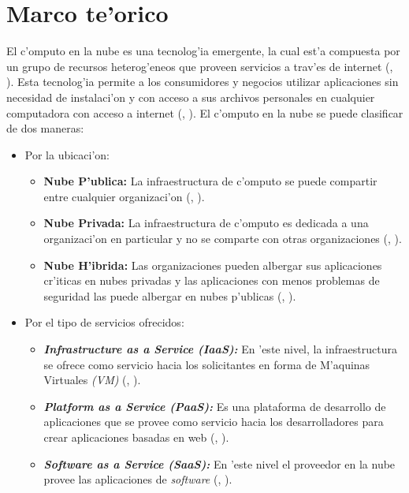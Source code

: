 \section{Marco te'orico}

El c'omputo en la nube es una tecnolog'ia emergente, la cual est'a compuesta por un grupo de recursos heterog'eneos que proveen servicios a trav'es de internet (\citeauthor{agarwal2014efficient}, \citeyear{agarwal2014efficient}).
Esta tecnolog'ia permite a los consumidores y negocios utilizar aplicaciones sin necesidad de instalaci'on y con acceso a sus archivos personales en cualquier computadora con acceso a internet (\citeauthor{ahmed2012advanced}, \citeyear{ahmed2012advanced}). 
El c'omputo en la nube se puede clasificar de dos maneras:
\begin{itemize}
	\item Por la ubicaci'on: 
	\begin{itemize}
		\item \textbf{Nube P'ublica:} La infraestructura de c'omputo se puede compartir entre cualquier organizaci'on (\citeauthor{ahmed2012advanced}, \citeyear{ahmed2012advanced}).
		\item \textbf{Nube Privada:} La infraestructura de c'omputo es dedicada a una organizaci'on en particular y no se comparte con otras organizaciones (\citeauthor{ahmed2012advanced}, \citeyear{ahmed2012advanced}).
		\item \textbf{Nube H'ibrida:} Las organizaciones pueden albergar sus aplicaciones cr'iticas en nubes privadas y las aplicaciones con menos problemas de seguridad las puede albergar en nubes p'ublicas (\citeauthor{ahmed2012advanced}, \citeyear{ahmed2012advanced}).
	\end{itemize}
	\item Por el tipo de servicios ofrecidos: 
	\begin{itemize}
		\item \textit{\textbf{Infrastructure as a Service (IaaS):}} En 'este nivel, la infraestructura se ofrece como servicio hacia los solicitantes en forma de M'aquinas Virtuales \textit{(VM)} (\citeauthor{agarwal2014efficient}, \citeyear{agarwal2014efficient}).
		\item \textit{\textbf{Platform as a Service (PaaS):}} Es una plataforma de desarrollo de aplicaciones que se provee como servicio hacia los desarrolladores para crear aplicaciones basadas en web (\citeauthor{agarwal2014efficient}, \citeyear{agarwal2014efficient}).
		\item \textit{\textbf{Software as a Service (SaaS):}} En 'este nivel el proveedor en la nube provee las aplicaciones de \textit{software} (\citeauthor{agarwal2014efficient}, \citeyear{agarwal2014efficient}).
	\end{itemize}
\end{itemize}




